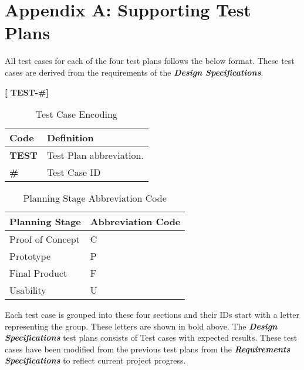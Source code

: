 
\setcounter{section}{8}
\section{Appendix A: Supporting Test Plans}
\bigskip


All test cases for each of the four test plans follows the below format. These test cases are derived from the 
requirements of the \textbf{\textit{Design Specifications}}.
\medskip
\begin{center}
	\textbf{[ TEST-\#]} 
\end{center}


\bgroup
\def\arraystretch{1.5}
\begin{table}[H]
\centering
\begin{tabular}{ | m{1cm} | m{13cm}| } 
\hline
\rowcolor{lightgray} \textbf{Code} & \textbf{Definition} \\ 
\hline
 \textbf{TEST} & Test Plan abbreviation. \\ 
\hline
 \textbf{\#} & Test Case ID \\ 
\hline
\end{tabular}
\caption{Test Case Encoding}
\end{table}

\bgroup
\def\arraystretch{1.5}
\begin{table}[H]
\centering
\begin{tabular}{ | m{7cm} | m{7cm}| } 
\hline
\rowcolor{lightgray} \textbf{Planning Stage} & \textbf{Abbreviation Code} \\ 
\hline
 Proof of Concept & C\\ 
\hline
 Prototype & P\\ 
\hline
 Final Product & F\\  
\hline
 Usability & U\\ 
\hline
\end{tabular}
\caption{Planning Stage Abbreviation Code}
\end{table}

Each test case is grouped into these four sections and their IDs start with a letter representing the group. These letters are shown in bold above.
The \textbf{\textit{Design Specifications}} test plans consists of Test cases with expected results. These test cases have been modified from the
previous test plans from the \textbf{\textit{Requirements Specifications}} to reflect current project progress.


\pagebreak

